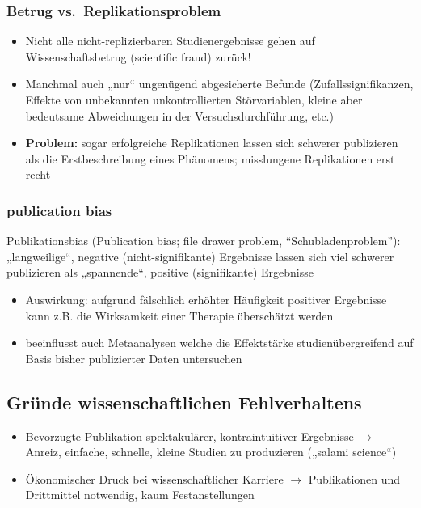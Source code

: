 \documentclass[
]{book}
\begin{document}
\hypertarget{betrug-vs.-replikationsproblem}{%
\subsubsection{Betrug vs.~Replikationsproblem}\label{betrug-vs.-replikationsproblem}}

\begin{itemize}
\item
  Nicht alle nicht-replizierbaren Studienergebnisse gehen auf Wissenschaftsbetrug (scientific fraud) zurück!
\item
  Manchmal auch „nur`` ungenügend abgesicherte Befunde (Zufallssignifikanzen, Effekte von unbekannten unkontrollierten Störvariablen, kleine aber bedeutsame Abweichungen in der Versuchsdurchführung, etc.)
\item
  \textbf{Problem:} sogar erfolgreiche Replikationen lassen sich schwerer publizieren als die Erstbeschreibung eines Phänomens; misslungene Replikationen erst recht
\end{itemize}

\hypertarget{publication-bias}{%
\subsubsection{publication bias}\label{publication-bias}}

Publikationsbias (Publication bias; file drawer problem, ``Schubladenproblem''): „langweilige``, negative (nicht-signifikante) Ergebnisse lassen sich viel schwerer publizieren als „spannende``, positive (signifikante) Ergebnisse

\begin{itemize}
\item
  Auswirkung: aufgrund fälschlich erhöhter Häufigkeit positiver Ergebnisse kann z.B. die Wirksamkeit einer Therapie überschätzt werden
\item
  beeinflusst auch Metaanalysen welche die Effektstärke studienübergreifend auf Basis bisher publizierter Daten untersuchen
\end{itemize}

\hypertarget{gruxfcnde-wissenschaftlichen-fehlverhaltens}{%
\subsection{Gründe wissenschaftlichen Fehlverhaltens}\label{gruxfcnde-wissenschaftlichen-fehlverhaltens}}

\begin{itemize}
\item
  Bevorzugte Publikation spektakulärer, kontraintuitiver Ergebnisse
  \(\rightarrow\) Anreiz, einfache, schnelle, kleine Studien zu produzieren („salami science``)
\item
  Ökonomischer Druck bei wissenschaftlicher Karriere
  \(\rightarrow\) Publikationen und Drittmittel notwendig, kaum Festanstellungen
\end{itemize}
\end{document}
